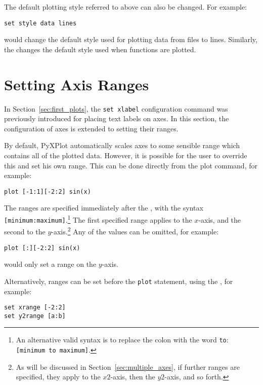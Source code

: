 The default plotting style referred to above can also be changed.  For example:

\begin{verbatim}
set style data lines
\end{verbatim}

\noindent would change the default style used for plotting data from files to
lines. Similarly, the  changes the default style
used when functions are plotted.

\section{Setting Axis Ranges}

In Section~\ref{sec:first_plots}, the {\tt set xlabel} configuration command
was previously introduced for placing text labels on axes. In this section, the
configuration of axes is extended to setting their ranges.

By default, PyXPlot automatically scales axes to some sensible range which
contains all of the plotted data. However, it is possible for the user to
override this and set his own range. This can be
done directly from the plot command, for example:

\begin{verbatim}
plot [-1:1][-2:2] sin(x)
\end{verbatim}
\label{sec:plot_ranges}

\noindent The ranges are specified immediately after the , with
the syntax {\tt [minimum:maximum]}.\footnote{An alternative valid syntax is to
replace the colon with the word {\tt to}: {\tt [minimum to maximum]}.} The
first specified range applies to the $x$-axis, and the second to the
$y$-axis.\footnote{As will be discussed in Section~\ref{sec:multiple_axes}, if
further ranges are specified, they apply to the $x2$-axis, then the $y2$-axis,
and so forth.} Any of the values can be omitted, for example:

\begin{verbatim}
plot [:][-2:2] sin(x)
\end{verbatim}

\noindent would only set a range on the $y$-axis.

Alternatively, ranges can be set before the {\tt plot} statement, using the
, for example:

\begin{verbatim}
set xrange [-2:2]
set y2range [a:b]
\end{verbatim}

